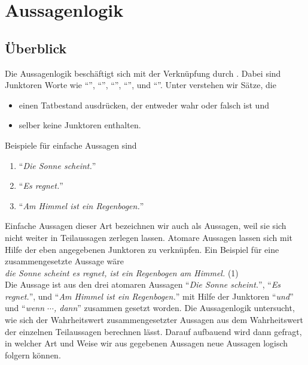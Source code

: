 \chapter{Aussagenlogik}
\section{Überblick}
Die Aussagenlogik beschäftigt sich mit der Verknüpfung  durch
.  Dabei sind Junktoren Worte wie ``'', ``'',
``'', ``'', und ``''.  Unter
 verstehen wir Sätze, die 
\begin{itemize}
\item einen Tatbestand ausdrücken, der entweder wahr oder falsch ist und 
\item selber keine Junktoren enthalten.
\end{itemize}
Beispiele für einfache Aussagen sind
\begin{enumerate}
\item ``\textsl{Die Sonne scheint.}''
\item ``\textsl{Es regnet.}''
\item ``\textsl{Am Himmel ist ein Regenbogen.}''
\end{enumerate}
Einfache Aussagen dieser Art bezeichnen wir auch als  Aussagen, weil sie
sich nicht weiter in 
Teilaussagen zerlegen lassen.  Atomare Aussagen lassen sich mit Hilfe der eben angegebenen Junktoren zu 
 verknüpfen.  Ein Beispiel für eine
zusammengesetzte Aussage wäre \\[0.2cm] 
\hspace*{1.3cm} \textsl{ die Sonne scheint  es regnet,  ist ein Regenbogen am Himmel.} 
\hspace*{\fill} (1)
\\[0.2cm]
Die Aussage ist aus den drei atomaren Aussagen ``\textsl{Die Sonne scheint.}'', ``\textsl{Es regnet.}'', und
``\textsl{Am Himmel ist ein Regenbogen.}'' mit Hilfe der Junktoren ``\textsl{und}'' und
``\textsl{wenn $\cdots$, dann}'' zusammen gesetzt worden.
Die Aussagenlogik untersucht, wie sich der Wahrheitswert zusammengesetzter Aussagen
aus dem Wahrheitswert der einzelnen Teilaussagen berechnen lässt.  Darauf
aufbauend wird dann gefragt, in welcher Art und Weise wir aus gegebenen Aussagen neue 
Aussagen logisch folgern können.

